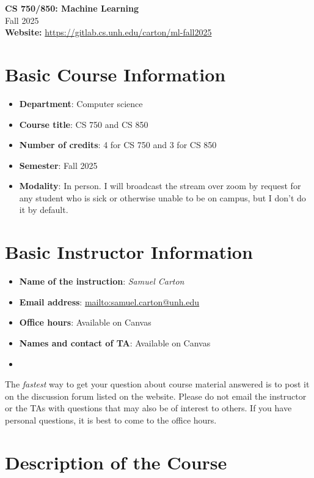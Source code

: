 \documentclass[11pt]{article}
\date{}
\begin{document}
\begin{center}
	{\Large\bf CS 750/850: Machine Learning}\\
	Fall 2025\\
	\textbf{Website:} \url{https://gitlab.cs.unh.edu/carton/ml-fall2025}
\end{center}


\section{Basic Course Information}

\begin{itemize}
\item \textbf{Department}: Computer science
\item \textbf{Course title}: CS 750 and CS 850
\item \textbf{Number of credits}: 4 for CS 750 and 3 for CS 850
\item \textbf{Semester}: Fall 2025
\item \textbf{Modality}: In person. I will broadcast the stream over zoom by request for any student
who is sick or otherwise unable to be on campus, but I don't do it by default.
\end{itemize}

\section{Basic Instructor Information}

\begin{itemize}
\item \textbf{Name of the instruction}: \emph{Samuel Carton}
\item \textbf{Email address}: \url{mailto:samuel.carton@unh.edu}
\item \textbf{Office hours}: Available on Canvas
\item \textbf{Names and contact of TA}: Available on Canvas
\item \end{itemize}

The \emph{fastest} way to get your question about course material answered is to post it on the discussion forum listed on the website.
Please do not email the instructor or the TAs with questions that may also be of interest to others.
If you have personal questions, it is best to come to the office hours.

\section{Description of the Course}
\end{document}
